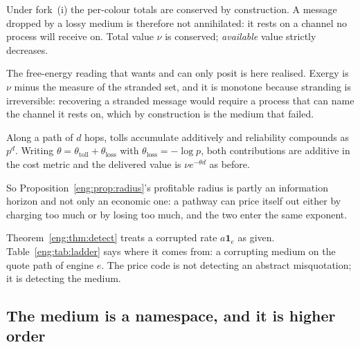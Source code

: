 \begin{proposition}
\label{eng:prop:strand}
Under fork~(i) the per-colour totals are conserved by construction. A
message dropped by a lossy medium is therefore not annihilated: it rests on
a channel no process will receive on. Total value $\nu$ is conserved;
\emph{available} value strictly decreases.
\end{proposition}

\begin{corollary}\label{eng:second-law-with-mechanism}
The free-energy reading that \cite[Rmk.~6.2]{vtok} wants and can only
posit is here realised. Exergy is $\nu$ minus the measure of the stranded
set, and it is monotone because stranding is irreversible: recovering a
stranded message would require a process that can name the channel it rests
on, which by construction is the medium that failed.
\end{corollary}

\begin{proposition}\label{eng:prop:twotheta}
Along a path of $d$ hops, tolls accumulate additively and reliability
compounds as $p^d$. Writing
$\theta = \theta_{\mathrm{toll}} + \theta_{\mathrm{loss}}$ with
$\theta_{\mathrm{loss}} = -\log p$, both contributions are additive in the
cost metric and the delivered value is $\nu e^{-\theta d}$ as before.
\end{proposition}

So Proposition~\ref{eng:prop:radius}'s profitable radius is partly an
information horizon and not only an economic one: a pathway can price
itself out either by charging too much or by losing too much, and the two
enter the same exponent.

\begin{remark}\label{eng:corruption-where-syndrome-comes}
Theorem~\ref{eng:thm:detect} treats a corrupted rate $a\mathbf{1}_e$ as given.
Table~\ref{eng:tab:ladder} says where it comes from: a corrupting medium on the
quote path of engine $e$. The price code is not detecting an abstract
misquotation; it is detecting the medium.
\end{remark}

\subsection{The medium is a namespace, and it is higher order}\label{eng:S5.4}

